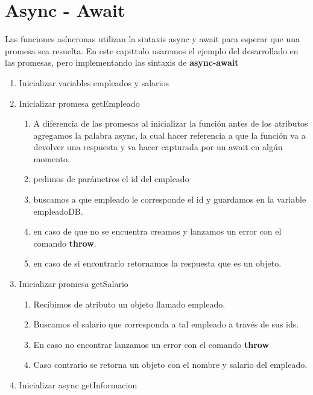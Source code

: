 \documentclass{report}
\begin{document}
\chapter{Async - Await}
Las funciones asíncronas utilizan la sintaxis async y await para esperar que una promesa sea resuelta.
En este capittulo usaremos el ejemplo del desarrollado en las promesas, pero implementando las sintaxis de \textbf{async-await}
\begin{enumerate}
  \item Inicializar variables empleados y salarios
  
  \item Inicializar promesa getEmpleado
  
  \begin{enumerate}
    \item A diferencia de las promesas al inicializar la función antes de los atributos agregamos la palabra async, la cual hacer referencia a que la función va a devolver una respuesta y va hacer capturada por un await en algún momento.
    \item pedimos de parámetros el id del empleado
    \item buscamos a que empleado le corresponde el id y guardamos en la variable empleadoDB.
    \item en caso de que no se encuentra creamos y lanzamos un error con el comando \textbf{throw}.
    \item en caso de si encontrarlo retornamos la respuesta que es un objeto.
  \end{enumerate}
  \item Inicializar promesa getSalario
  
  \begin{enumerate}
    \item Recibimos de atributo un objeto llamado empleado.
    \item Buscamos el salario que corresponda a tal empleado a través de sus ids.
    \item En caso no encontrar lanzamos un error con el comando \textbf{throw}
    \item Caso contrario se retorna un objeto con el nombre y salario del empleado.
  \end{enumerate}
  \item Inicializar  async getInformacion
  

\end{enumerate}
\end{document}
